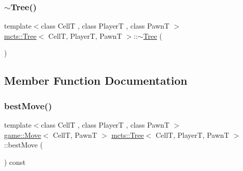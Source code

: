 \mbox{\label{classmcts_1_1_tree_a4656482e061c8dd2b78fcf048c1b20a3}} 
\subsubsection{\texorpdfstring{$\sim$\+Tree()}{~Tree()}}
{\footnotesize\ttfamily template$<$class CellT , class PlayerT , class PawnT $>$ \\
\hyperlink{classmcts_1_1_tree}{mcts\+::\+Tree}$<$ CellT, PlayerT, PawnT $>$\+::$\sim$\hyperlink{classmcts_1_1_tree}{Tree} (\begin{DoxyParamCaption}{ }\end{DoxyParamCaption})}



\subsection{Member Function Documentation}
\mbox{\label{classmcts_1_1_tree_a0431bd1074e29e682fe3c7bc6a3aee89}} 
\subsubsection{\texorpdfstring{best\+Move()}{bestMove()}}
{\footnotesize\ttfamily template$<$class CellT , class PlayerT , class PawnT $>$ \\
\hyperlink{structgame_1_1_move}{game\+::\+Move}$<$ CellT, PawnT $>$ \hyperlink{classmcts_1_1_tree}{mcts\+::\+Tree}$<$ CellT, PlayerT, PawnT $>$\+::best\+Move (\begin{DoxyParamCaption}{ }\end{DoxyParamCaption}) const}

